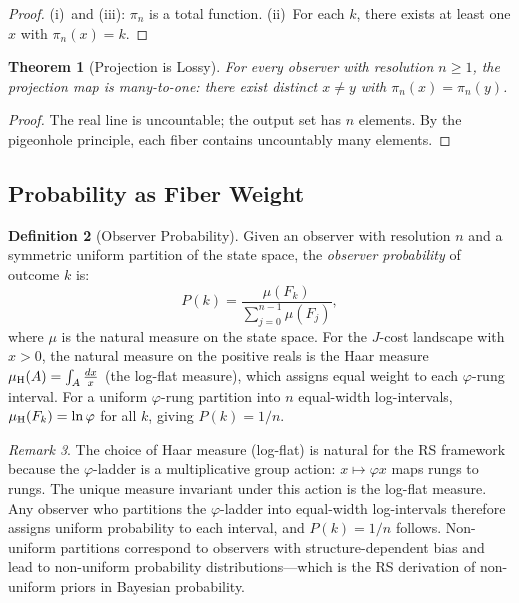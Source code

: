 \documentclass[12pt,a4paper]{article}
\newtheorem{theorem}{Theorem}[section]
\theoremstyle{definition}
\newtheorem{definition}[theorem]{Definition}
\theoremstyle{remark}
\newtheorem{remark}[theorem]{Remark}
\begin{document}
\begin{proof}
(i)~and (iii): $\pi_n$ is a total function.
(ii)~For each $k$, there exists at least one $x$ with $\pi_n(x) = k$.
\end{proof}

\begin{theorem}[Projection is Lossy]
\label{thm:lossy}
For every observer with resolution $n \geq 1$, the projection map is
many-to-one: there exist distinct $x \neq y$ with
$\pi_n(x) = \pi_n(y)$.
\end{theorem}

\begin{proof}
The real line is uncountable; the output set has $n$ elements.  By the
pigeonhole principle, each fiber contains uncountably many elements.
\end{proof}

\subsection{Probability as Fiber Weight}

\begin{definition}[Observer Probability]
\label{def:prob}
Given an observer with resolution $n$ and a symmetric uniform partition
of the state space, the \emph{observer probability} of outcome $k$ is:
\begin{equation}
  P(k) = \frac{\mu(F_k)}{\sum_{j=0}^{n-1}\mu(F_j)},
\end{equation}
where $\mu$ is the natural measure on the state space.  For the
$J$-cost landscape with $x > 0$, the natural measure on the positive
reals is the Haar measure $\mu_{\rm H}(A) = \int_A \frac{dx}{x}$
(the log-flat measure), which assigns equal weight to each $\varphi$-rung
interval.  For a uniform $\varphi$-rung partition into $n$ equal-width
log-intervals, $\mu_{\rm H}(F_k) = \ln\varphi$ for all $k$, giving
$P(k) = 1/n$.
\end{definition}

\begin{remark}
The choice of Haar measure (log-flat) is natural for the RS framework
because the $\varphi$-ladder is a multiplicative group action: $x \mapsto
\varphi x$ maps rungs to rungs.  The unique measure invariant under this
action is the log-flat measure.  Any observer who partitions the
$\varphi$-ladder into equal-width log-intervals therefore assigns uniform
probability to each interval, and $P(k) = 1/n$ follows.  Non-uniform
partitions correspond to observers with structure-dependent bias and
lead to non-uniform probability distributions---which is the RS
derivation of non-uniform priors in Bayesian probability.
\end{remark}
\end{document}
